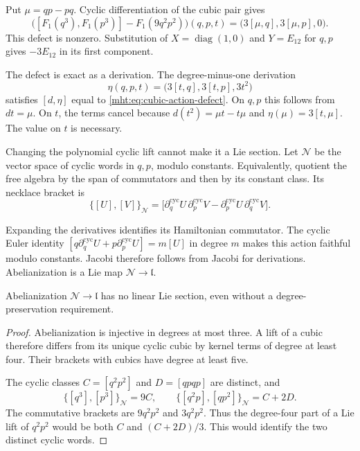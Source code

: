 Put $\mu=qp-pq$. Cyclic differentiation of the cubic pair gives
\begin{equation}\label{mht:eq:cubic-action-defect}
 \bigl([F_1(q^3),F_1(p^3)]-F_1(9q^2p^2)\bigr)(q,p,t)
 =\bigl(3[\mu,q],3[\mu,p],0\bigr).
\end{equation}
This defect is nonzero. Substitution of
$X=\operatorname{diag}(1,0)$ and $Y=E_{12}$ for $q,p$ gives
$-3E_{12}$ in its first component.

The defect is exact as a derivation. The degree-minus-one derivation
\begin{equation}\label{mht:eq:cubic-action-homotopy}
 \eta(q,p,t)=\bigl(3[t,q],3[t,p],3t^2\bigr)
\end{equation}
satisfies $[d,\eta]$ equal to \eqref{mht:eq:cubic-action-defect}.
On $q,p$ this follows from $dt=\mu$. On $t$, the terms cancel
because $d(t^2)=\mu t-t\mu$ and
$\eta(\mu)=3[t,\mu]$. The value on $t$ is necessary.

Changing the polynomial cyclic lift cannot make it a Lie section.
Let $\mathcal N$ be the vector space of cyclic words in $q,p$,
modulo constants. Equivalently, quotient the free algebra by the
span of commutators and then by its constant class. Its necklace
bracket is
\[
 \{[U],[V]\}_{\mathcal N}
 =\bigl[\partial_q^{\mathrm{cyc}}U\,
          \partial_p^{\mathrm{cyc}}V
       -\partial_p^{\mathrm{cyc}}U\,
          \partial_q^{\mathrm{cyc}}V\bigr].
\]

Expanding the derivatives identifies its Hamiltonian commutator.
The cyclic Euler identity
$[q\partial_q^{\mathrm{cyc}}U+p\partial_p^{\mathrm{cyc}}U]
=m[U]$ in degree $m$ makes this action faithful modulo constants.
Jacobi therefore follows from Jacobi for derivations.
Abelianization is a Lie map $\mathcal N\to\mathfrak l$.

\begin{proposition}\label{mht:prop:necklace-no-section}
Abelianization $\mathcal N\to\mathfrak l$ has no linear Lie
section, even without a degree-preservation requirement.
\end{proposition}

\begin{proof}
Abelianization is injective in degrees at most three. A lift of a
cubic therefore differs from its unique cyclic cubic by kernel
terms of degree at least four. Their brackets with cubics have
degree at least five.

The cyclic classes $C=[q^2p^2]$ and $D=[qpqp]$ are distinct, and
\[
 \{[q^3],[p^3]\}_{\mathcal N}=9C,
 \qquad
 \{[q^2p],[qp^2]\}_{\mathcal N}=C+2D.
\]
The commutative brackets are $9q^2p^2$ and $3q^2p^2$.
Thus the degree-four part of a Lie lift of $q^2p^2$ would be both
$C$ and $(C+2D)/3$. This would identify the two distinct cyclic
words.
\end{proof}


